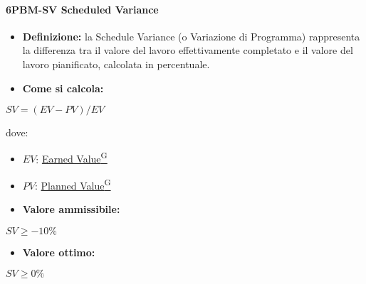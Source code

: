 \paragraph*{6PBM-SV Scheduled Variance}
\begin{itemize}
    \item \textbf{Definizione:} la Schedule Variance (o Variazione di Programma) rappresenta la differenza tra il valore del lavoro effettivamente completato e il valore del lavoro pianificato, calcolata in percentuale.
    \item \textbf{Come si calcola:}
\end{itemize}
\begin{center}
   $SV = (EV-PV)/EV$ 
\end{center}
dove:
\begin{itemize}[label=$\rightarrow$]
    \item $EV$: \href{https://code7crusaders.github.io/docs/PB/documentazione_interna/glossario.html#earned-value}{Earned Value\textsuperscript{G}}
    \item $PV$: \href{https://code7crusaders.github.io/docs/PB/documentazione_interna/glossario.html#planned-value}{Planned Value\textsuperscript{G}}
\end{itemize}
\begin{itemize}
    \item \textbf{Valore ammissibile:}
\end{itemize}
\begin{center}
    $SV \geq -10\%$
\end{center}
\begin{itemize}
    \item \textbf{Valore ottimo:}
\end{itemize}
\begin{center}
    $SV \geq 0\%$
\end{center}


